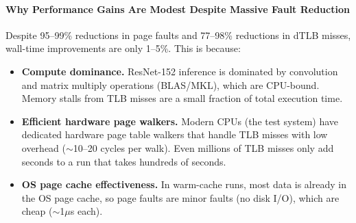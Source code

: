 \documentclass[conference]{IEEEtran}
\begin{document}
\paragraph{Why Performance Gains Are Modest Despite Massive Fault Reduction}
Despite 95--99\% reductions in page faults and 77--98\% reductions in dTLB misses, wall-time improvements are only 1--5\%. This is because:

\begin{itemize}
\item \textbf{Compute dominance.} ResNet-152 inference is dominated by convolution and matrix multiply operations (BLAS/MKL), which are CPU-bound. Memory stalls from TLB misses are a small fraction of total execution time.

\item \textbf{Efficient hardware page walkers.} Modern CPUs (the test system) have dedicated hardware page table walkers that handle TLB misses with low overhead ($\sim$10--20 cycles per walk). Even millions of TLB misses only add seconds to a run that takes hundreds of seconds.

\item \textbf{OS page cache effectiveness.} In warm-cache runs, most data is already in the OS page cache, so page faults are minor faults (no disk I/O), which are cheap ($\sim$1$\mu$s each).
\end{itemize}
\end{document}
